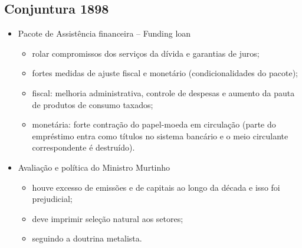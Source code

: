 \documentclass[a4paper,12pt]{article}[abntex2]
\begin{document}
\subsection{\textbf{Conjuntura 1898}}
\begin{itemize}
    \item  Pacote de Assistência financeira – Funding loan
    \begin{itemize}
        \item rolar compromissos dos serviços da dívida e garantias de juros;
    \end{itemize}
    \begin{itemize}
        \item fortes medidas de ajuste fiscal e monetário (condicionalidades do pacote);
    \end{itemize}
\begin{itemize}
    \item fiscal: melhoria administrativa, controle de despesas e aumento da pauta de produtos de consumo taxados;
\end{itemize}
\begin{itemize}
    \item monetária: forte contração do papel-moeda em circulação (parte do empréstimo entra como títulos no sistema bancário e o meio circulante correspondente é destruído).
\end{itemize}
\item Avaliação e política do Ministro Murtinho
\begin{itemize}
    \item houve excesso de emissões e de capitais ao longo da década e isso foi prejudicial;
\end{itemize}
\begin{itemize}
    \item deve imprimir seleção natural aos setores;
\end{itemize}
\begin{itemize}
    \item seguindo a doutrina metalista.
\end{itemize}
\end{itemize}
\end{document}
